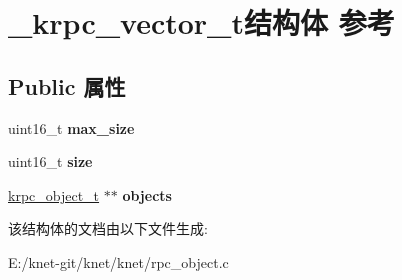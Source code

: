 \hypertarget{struct__krpc__vector__t}{}\section{\+\_\+krpc\+\_\+vector\+\_\+t结构体 参考}
\label{struct__krpc__vector__t}
\subsection*{Public 属性}
\begin{DoxyCompactItemize}
\item 
\hypertarget{struct__krpc__vector__t_a638dd282a405dac21dc8239a04a63ae6}{}uint16\+\_\+t {\bfseries max\+\_\+size}\label{struct__krpc__vector__t_a638dd282a405dac21dc8239a04a63ae6}

\item 
\hypertarget{struct__krpc__vector__t_a4374b6ae38e42d0fd258c5c022dce29d}{}uint16\+\_\+t {\bfseries size}\label{struct__krpc__vector__t_a4374b6ae38e42d0fd258c5c022dce29d}

\item 
\hypertarget{struct__krpc__vector__t_a5201adcd64352f3dd5ca3d75511679c8}{}\hyperlink{struct__krpc__object__t}{krpc\+\_\+object\+\_\+t} $\ast$$\ast$ {\bfseries objects}\label{struct__krpc__vector__t_a5201adcd64352f3dd5ca3d75511679c8}

\end{DoxyCompactItemize}


该结构体的文档由以下文件生成\+:\begin{DoxyCompactItemize}
\item 
E\+:/knet-\/git/knet/knet/rpc\+\_\+object.\+c\end{DoxyCompactItemize}

